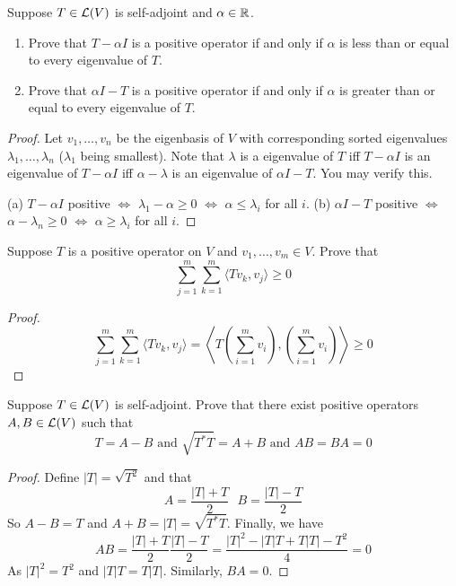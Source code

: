 \documentclass{extarticle}
\begin{document}
\begin{problem}{13}
    Suppose \(T \in \mathcal{L}(V)\) is self-adjoint and \(\alpha \in \mathbb{R}\). 
    \begin{enumerate}[label=(\alph*)]
        \item Prove that \(T - \alpha I\) is a positive operator if and only if \(\alpha\) is less 
        than or equal to every eigenvalue of \(T\).
        \item Prove that \(\alpha I - T\) is a positive operator if and only if \(\alpha\) is 
        greater than or equal to every eigenvalue of \(T\).
    \end{enumerate}
\end{problem}

\begin{proof}
Let \(v_1, \ldots, v_n\) be the eigenbasis of \(V\) with corresponding sorted eigenvalues \(\lambda_1, 
\ldots, \lambda_n\) (\(\lambda_1\) being smallest). Note that \(\lambda\) is a eigenvalue of \(T\) iff \(T- \alpha I\) is 
an eigenvalue of \(T - \alpha I\) iff \(\alpha - \lambda\) is an eigenvalue of \(\alpha I - T\). You 
may verify this.

(a) \(T - \alpha I\) positive \(\Longleftrightarrow\) \(\lambda_1 - \alpha \geq 0\) 
\(\Longleftrightarrow\) \(\alpha \leq \lambda_i\) for all \(i\). 
(b) \(\alpha I  -T\) positive \(\Longleftrightarrow\) \(\alpha - \lambda_n \geq 0\) 
\(\Longleftrightarrow\) \(\alpha \geq \lambda_i\) for all \(i\).
\end{proof}

\begin{problem}{14}
    Suppose \(T\) is a positive operator on \(V\) and \(v_1, \ldots, v_m \in V\). Prove that 
    \[\sum_{j=1}^{m} \sum_{k=1}^{m} \langle Tv_k,v_j \rangle \geq 0\]
\end{problem}

\begin{proof}
\[\sum_{j=1}^{m} \sum_{k=1}^{m} \langle Tv_k,v_j \rangle  
= \left\langle T\left(\sum_{i=1}^{m} v_i \right), \left(\sum_{i=1}^{m} v_i \right) \right\rangle \geq 0\]
\end{proof}

\begin{problem}{15}
    Suppose \(T \in \mathcal{L}(V)\) is self-adjoint. Prove that there exist positive operators \(A, B 
    \in \mathcal{L}(V)\) such that 
    \[T = A - B \text{ and } \sqrt{T^* T} = A + B \text{ and } AB = BA = 0\]
\end{problem}

\begin{proof}
Define \(|T| = \sqrt{T^2}\) and that 
\[A = \frac{|T| + T}{2} \ \ \ B = \frac{|T| - T}{2}\]
So \(A - B = T\) and \(A+B = |T| = \sqrt{T^* T}\). Finally, we have
\[AB = \frac{|T| + T}{2} \frac{|T| - T}{2} = \frac{|T|^2 - |T|T + T|T| - T^2}{4} = 0\] 
As \(|T|^2 = T^2\) and \(|T|T = T|T|\). Similarly, \(BA = 0\).
\end{proof}
\end{document}
